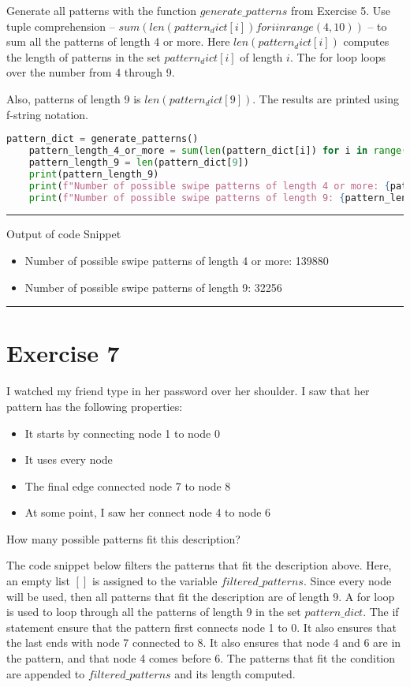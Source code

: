 \documentclass[12pt]{article}
\theoremstyle{definition}
\begin{document}
Generate all patterns with the function $generate\_patterns$ from Exercise 5.
Use tuple comprehension -- $sum(len(pattern_dict[i]) for i in range(4,10))$ -- to sum all the patterns of length 4 or more. Here $len(pattern_dict[i])$ computes 
the length of patterns in the set $pattern_dict[i]$ of length $i$. The for loop loops over the number from 4 through 9.

Also, patterns of length 9 is $len(pattern_dict[9])$. The results are printed using f-string notation.

\begin{lstlisting}[language=Python, caption=Exercise 6]
    pattern_dict = generate_patterns()
    pattern_length_4_or_more = sum(len(pattern_dict[i]) for i in range(4,10))
    pattern_length_9 = len(pattern_dict[9])
    print(pattern_length_9)
    print(f"Number of possible swipe patterns of length 4 or more: {pattern_length_4_or_more}")
    print(f"Number of possible swipe patterns of length 9: {pattern_length_9}")
\end{lstlisting}

{\color{red} \rule{\linewidth}{0.5mm}}
Output of code Snippet
\begin{itemize}
    \item Number of possible swipe patterns of length 4 or more: 139880
    \item Number of possible swipe patterns of length 9: 32256
\end{itemize}
{\color{red} \rule{\linewidth}{0.5mm}}

\section*{Exercise 7}
I watched my friend type in her password over her shoulder. I saw that her pattern has the following properties:
\begin{itemize}
    \item It starts by connecting node 1 to node 0
    \item It uses every node
    \item The final edge connected node 7 to node 8
    \item At some point, I saw her connect node 4 to node 6
\end{itemize}
How many possible patterns fit this description? 

The code snippet below filters the patterns that fit the description above. Here, an empty list $[]$ is assigned to the variable $filtered\_patterns$.
Since every node will be used, then all patterns that fit the description are of length 9. A for loop is used to loop through all the patterns of 
length 9 in the set $pattern\_dict$. The if statement ensure that the pattern first connects node 1 to 0. It also ensures that the last ends with node 7 connected to 8. 
It also ensures that node 4 and 6 are in the pattern, and that node 4 comes before 6. The patterns that fit the condition are appended to $filtered\_patterns$ and its 
length computed.
\end{document}
